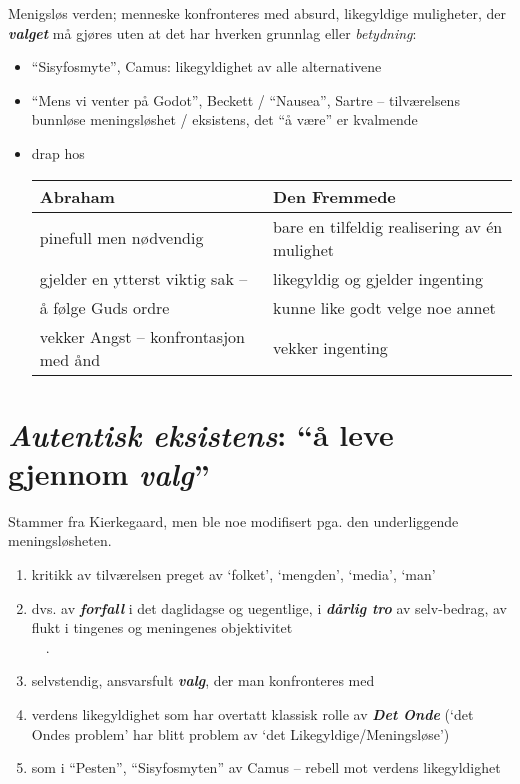 \documentclass[12pt]{article}
\newcommand{\co}[1]{{\bf\em #1\/}}
\newcommand{\citt}[1]{{\em #1}}
\newcommand{\ut}[1]{\\ \ \ .\dotfill{\small\bf #1}}
\begin{document}
Menigsl{\o}s verden; menneske konfronteres med absurd, likegyldige
muligheter, der \co{valget} m{\aa} gj{\o}res uten at det har hverken grunnlag
eller {\em betydning}:
\begin{itemize}
\item ``Sisyfosmyte'', Camus: likegyldighet av alle alternativene
\item ``Mens vi venter p{\aa} Godot'', Beckett / ``Nausea'', Sartre --
tilv{\ae}relsens bunnl{\o}se meningsl{\o}shet / eksistens, det ``{\aa} v{\ae}re'' er kvalmende
\item drap hos \\
\hspace*{-1em}\begin{tabular}{l|l}
Abraham & Den Fremmede \\ \hline
pinefull men n{\o}dvendig  & bare en tilfeldig realisering av
\'{e}n mulighet \\
gjelder en ytterst viktig sak -- & likegyldig og
gjelder ingenting \\
{\aa} f{\o}lge Guds ordre & kunne like godt velge noe annet \\
vekker Angst -- konfrontasjon med {\aa}nd & vekker ingenting
\end{tabular}
\end{itemize}

\newpage
\section{\co{Autentisk eksistens}: ``{\aa} leve gjennom \co{valg}''}
Stammer fra Kierkegaard, men ble noe modifisert pga. den underliggende
meningsl{\o}sheten. 
\begin{enumerate}
\item kritikk av tilv{\ae}relsen preget av `folket', `mengden', `media',
`man'
\item[{}] dvs. av \co{forfall} i det daglidagse og uegentlige, i \co{d{\aa}rlig tro}
av selv-bedrag, av flukt i tingenes og meningenes objektivitet  
\ut{mengden -- individ}
\item selvstendig, ansvarsfult \co{valg}, der man konfronteres med
\item verdens likegyldighet som har overtatt klassisk rolle av \co{Det Onde}
(`det Ondes problem' har blitt problem av `det Likegyldige/Meningsl{\o}se')
\item som i ``Pesten'', ``Sisyfosmyten'' av Camus -- rebell mot verdens likegyldighet
\end{enumerate}
\end{document}
